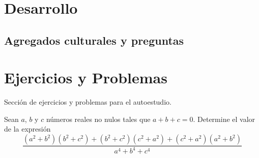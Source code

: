 \section{Desarrollo}

\subsection{Agregados culturales y preguntas}
{

}

\section{Ejercicios y Problemas}
{
    Sección de ejercicios y problemas para el autoestudio.

    \begin{section-problem}
        Sean $a$, $b$ y $c$ números reales no nulos tales que $a + b + c = 0$.
        Determine el valor de la expresión
        \[\frac{(a^2 + b^2)(b^2 + c^2) + (b^2 + c^2)(c^2 + a^2) + (c^2 + a^2)(a^2 + b^2)}{a^4 + b^4 + c^4}\]
    \end{section-problem}
}